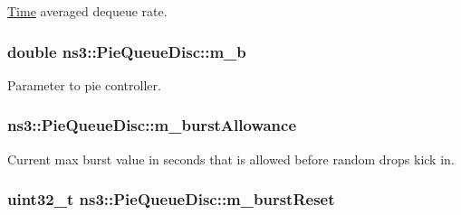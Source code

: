 \hyperlink{classns3_1_1Time}{Time} averaged dequeue rate. 

\subsubsection[{\texorpdfstring{m\+\_\+b}{m_b}}]{\setlength{\rightskip}{0pt plus 5cm}double ns3\+::\+Pie\+Queue\+Disc\+::m\+\_\+b\hspace{0.3cm}{\ttfamily [private]}}\hypertarget{classns3_1_1PieQueueDisc_aebef26b64ae9bb0f1f151820f9621ce1}{}\label{classns3_1_1PieQueueDisc_aebef26b64ae9bb0f1f151820f9621ce1}


Parameter to pie controller. 

\subsubsection[{\texorpdfstring{m\+\_\+burst\+Allowance}{m_burstAllowance}}]{ ns3\+::\+Pie\+Queue\+Disc\+::m\+\_\+burst\+Allowance\hspace{0.3cm}{\ttfamily [private]}}\hypertarget{classns3_1_1PieQueueDisc_a563714deac3a4d2f55f823b964c1b8b8}{}\label{classns3_1_1PieQueueDisc_a563714deac3a4d2f55f823b964c1b8b8}


Current max burst value in seconds that is allowed before random drops kick in. 

\subsubsection[{\texorpdfstring{m\+\_\+burst\+Reset}{m_burstReset}}]{\setlength{\rightskip}{0pt plus 5cm}uint32\+\_\+t ns3\+::\+Pie\+Queue\+Disc\+::m\+\_\+burst\+Reset\hspace{0.3cm}{\ttfamily [private]}}\hypertarget{classns3_1_1PieQueueDisc_a85157ab176cd53b269993752d39faa76}{}\label{classns3_1_1PieQueueDisc_a85157ab176cd53b269993752d39faa76}


